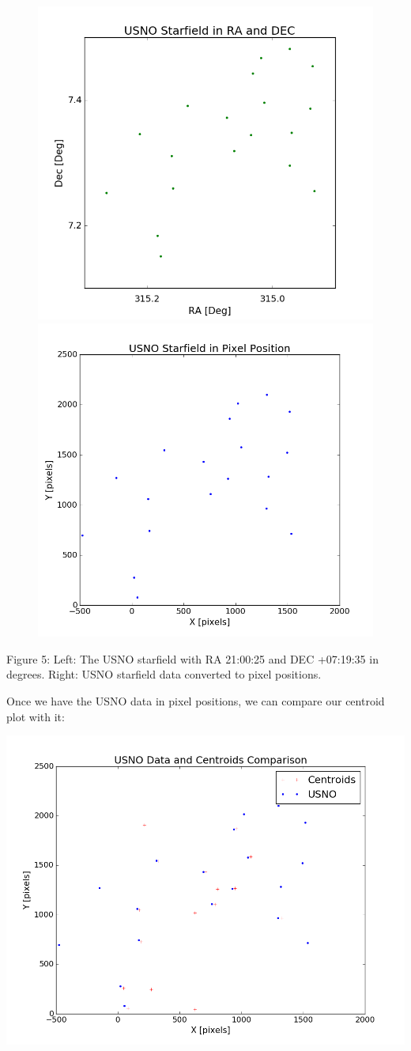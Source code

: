 \documentclass[onecolumn, 12pt, a4paper]{article}
\begin{document}
\begin{subfigure}{\linewidth}\hspace*{-1.5cm}
  \includegraphics[width=.55\linewidth]{figure_1-5.png}
  \includegraphics[width=.55\linewidth]{figure_1-6.png}
  \end{subfigure}\par\medskip

\newline
Figure 5: Left: The USNO starfield with RA 21:00:25 and DEC +07:19:35 in degrees. Right: USNO starfield data converted to pixel positions. \newline

Once we have the USNO data in pixel positions, we can compare our centroid plot with it:

\centerline{\includegraphics[scale=.4]{figure_1-7.png}}
\end{document}

